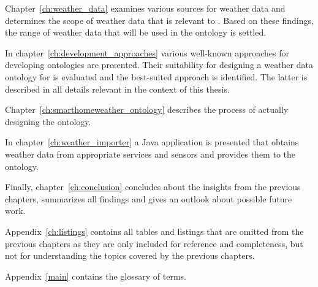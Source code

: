 Chapter~\ref{ch:weather_data} examines various sources for weather data and determines the scope of weather data that is relevant to \thinkhome. Based on these findings, the range of weather data that will be used in the ontology is settled.

In chapter~\ref{ch:development_approaches} various well-known approaches for developing ontologies are presented. Their suitability for designing a weather data ontology for \thinkhome is evaluated and the best-suited approach is identified. The latter is described in all details relevant in the context of this thesis.

Chapter~\ref{ch:smarthomeweather_ontology} describes the process of actually designing the ontology.

In chapter~\ref{ch:weather_importer} a Java application is presented that obtains weather data from appropriate services and sensors and provides them to the \thinkhome ontology.

Finally, chapter~\ref{ch:conclusion} concludes about the insights from the previous chapters, summarizes all findings and gives an outlook about possible future work.

Appendix~\ref{ch:listings} contains all tables and listings that are omitted from the previous chapters as they are only included for reference and completeness, but not for understanding the topics covered by the previous chapters.

Appendix~\ref{main} contains the glossary of terms.
